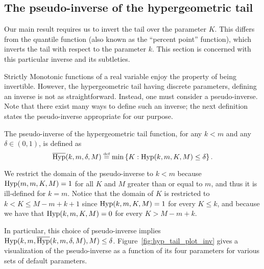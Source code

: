 \documentclass[twoside,11pt]{article}
\newcommand{\cb}[1]{\left\{#1\right\}}
\newcommand{\eqdef}{\overset{\smash{\mbox{\tiny \rm def}}}{=}}
\newcommand{\Hyp}{\textnormal{Hyp}}
\newcommand{\HypInv}{\overline{\textnormal{Hyp}}}
\begin{document}
\subsection{The pseudo-inverse of the hypergeometric tail}
\label{app:hyp_tail_inv}

Our main result requires us to invert the tail over the parameter $K$.
This differs from the quantile function (also known as the ``percent point'' function), which inverts the tail with respect to the parameter $k$.
This section is concerned with this particular inverse and its subtleties.

Strictly Monotonic functions of a real variable enjoy the property of being invertible.
However, the hypergeometric tail having discrete parameters, defining an inverse is not as straightforward.
Instead, one must consider a pseudo-inverse.
Note that there exist many ways to define such an inverse; the next definition states the pseudo-inverse appropriate for our purpose.


\begin{definition}\label{def:app_hyp_tail_inv}
The pseudo-inverse of the hypergeometric tail function, for any $k < m$ and any $\delta \in (0,1)$, is defined as
\begin{equation*}
    \HypInv(k, m, \delta, M) \eqdef \min \cb{ K : \Hyp(k, m, K, M) \le \delta }.
\end{equation*}
\end{definition}
We restrict the domain of the pseudo-inverse to $k < m$ because $\Hyp(m,m,K,M) = 1$ for all $K$ and $M$ greater than or equal to $m$, and thus it is ill-defined for $k=m$.
Notice that the domain of $K$ is restricted to $k < K \le M - m + k + 1$ since $\Hyp(k,m,K,M)=1$ for every $K \leq k$, and because we have that $\Hyp(k,m,K,M)=0$ for every $K > M-m+k$.

In particular, this choice of pseudo-inverse implies $\Hyp(k,m,\HypInv(k,m,\delta,M),M) \le \delta$.
Figure~\ref{fig:hyp_tail_plot_inv} gives a visualization of the pseudo-inverse as a function of its four parameters for various sets of default parameters.
\end{document}
